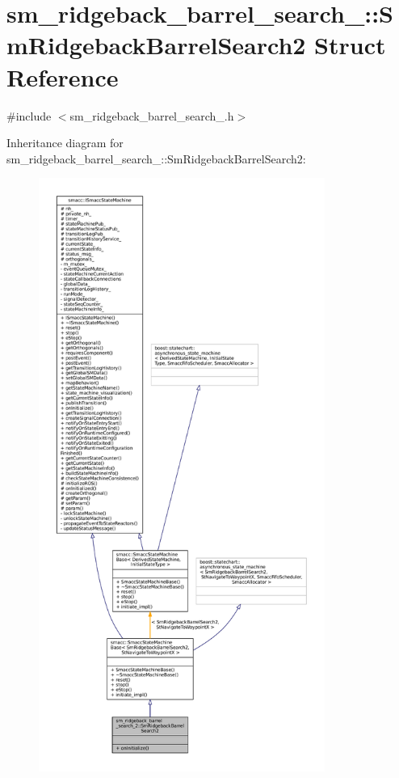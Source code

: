 \hypertarget{structsm__ridgeback__barrel__search__2_1_1SmRidgebackBarrelSearch2}{}\section{sm\+\_\+ridgeback\+\_\+barrel\+\_\+search\+\_\+:\+:Sm\+Ridgeback\+Barrel\+Search2 Struct Reference}
\label{structsm__ridgeback__barrel__search__2_1_1SmRidgebackBarrelSearch2}


{\ttfamily \#include $<$sm\+\_\+ridgeback\+\_\+barrel\+\_\+search\+\_.\+h$>$}



Inheritance diagram for sm\+\_\+ridgeback\+\_\+barrel\+\_\+search\+\_\+:\+:Sm\+Ridgeback\+Barrel\+Search2\+:
\nopagebreak
\begin{figure}[H]
\begin{center}
\leavevmode
\includegraphics[height=550pt]{structsm__ridgeback__barrel__search__2_1_1SmRidgebackBarrelSearch2__inherit__graph}
\end{center}
\end{figure}


